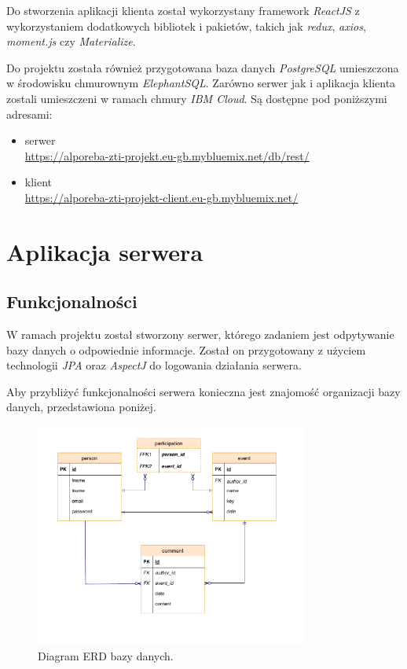 \documentclass[12pt]{article}
\begin{document}
Do stworzenia aplikacji klienta został wykorzystany framework \textit{ReactJS} z wykorzystaniem dodatkowych bibliotek i pakietów, takich jak \textit{redux}, \textit{axios}, \textit{moment.js} czy \textit{Materialize}.

Do projektu została również przygotowana baza danych \textit{PostgreSQL} umieszczona w środowisku chmurownym \textit{ElephantSQL}. Zarówno serwer jak i aplikacja klienta zostali umieszczeni w ramach chmury \textit{IBM Cloud}. Są dostępne pod poniższymi adresami:
\begin{itemize}
\item serwer \\ \url{https://alporeba-zti-projekt.eu-gb.mybluemix.net/db/rest/}
\item klient \\ \url{https://alporeba-zti-projekt-client.eu-gb.mybluemix.net/}
\end{itemize}

\pagebreak
\section{Aplikacja serwera}
\subsection{Funkcjonalności}
W ramach projektu został stworzony serwer, którego zadaniem jest odpytywanie bazy danych o odpowiednie informacje. Został on przygotowany z użyciem technologii \textit{JPA} oraz \textit{AspectJ} do logowania działania serwera.

Aby przybliżyć funkcjonalności serwera konieczna jest znajomość organizacji bazy danych, przedstawiona poniżej.

\begin{figure}[H]
\centering
\includegraphics[width=0.8\textwidth]{erd.pdf}
\caption{Diagram ERD bazy danych.}
\end{figure}
\end{document}
